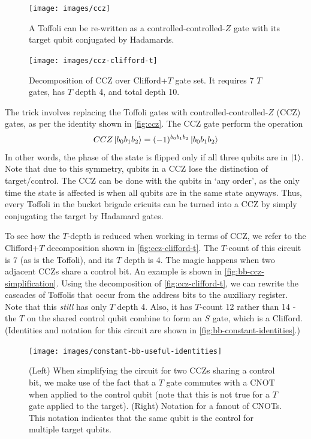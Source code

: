 \documentclass[a4paper,12pt]{article}
\begin{document}
\begin{figure}
 \centering 
 \captionsetup{width=.89\linewidth}
 \texttt{[image: images/ccz]}
 \caption{A Toffoli can be re-written as a controlled-controlled-$Z$ gate with its target qubit conjugated by Hadamards.}
 \label{fig:ccz}
\end{figure}

\begin{figure}
 \centering
  \captionsetup{width=.89\linewidth}
 \texttt{[image: images/ccz-clifford-t]}
 \caption{Decomposition of CCZ over Clifford+$T$ gate set. It requires 7 $T$ gates, has $T$ depth 4, and total depth 10.}
 \label{fig:ccz-clifford-t}
\end{figure}

The trick involves replacing the Toffoli gates with controlled-controlled-$Z$ (CCZ) gates, as per the identity shown in \autoref{fig:ccz}. The CCZ gate perform the operation
\begin{equation}
 CCZ \ket{b_0 b_1 b_2} = (-1)^{b_0 b_1 b_2} \ket{b_0 b_1 b_2}
\end{equation}
In other words, the phase of the state is flipped only if all three qubits are in $\ket{1}$. Note that due to this symmetry, qubits in a CCZ lose the distinction of target/control. 
The CCZ can be done with the qubits in `any order', as the only time the state is affected is when all qubits are in the same state anyways.
Thus, every Toffoli in the bucket brigade cricuits can be turned into a CCZ by simply conjugating the target by Hadamard gates. 


To see how the $T$-depth is reduced when working in terms of CCZ, we refer to the Clifford+$T$ decomposition shown in \autoref{fig:ccz-clifford-t}. 
The $T$-count of this circuit is 7 (as is the Toffoli), and its $T$ depth is 4. 
The magic happens when two adjacent CCZs share a control bit. 
An example is shown in \autoref{fig:bb-ccz-simplification}. 
Using the decomposition of \autoref{fig:ccz-clifford-t}, we can rewrite the cascades of Toffolis that occur from the address bits to the auxiliary register. 
Note that this \emph{still} has only $T$ depth 4.
Also, it has $T$-count 12 rather than 14 - the $T$ on the shared control qubit combine to form an $S$ gate, which is a Clifford. 
(Identities and notation for this circuit are shown in \autoref{fig:bb-constant-identities}.)

\begin{figure}[ht]
 \centering
  \captionsetup{width=.89\linewidth}
 \texttt{[image: images/constant-bb-useful-identities]}
 \caption{(Left) When simplifying the circuit for two CCZs sharing a control bit, we make use of the fact that a $T$ gate commutes with a CNOT when applied to the control qubit (note that this is not true for a $T$ gate applied to the target). 
 (Right) Notation for a fanout of CNOTs. This notation indicates that the same qubit is the control for multiple target qubits.}
 \label{fig:bb-constant-identities}
\end{figure}
\end{document}
